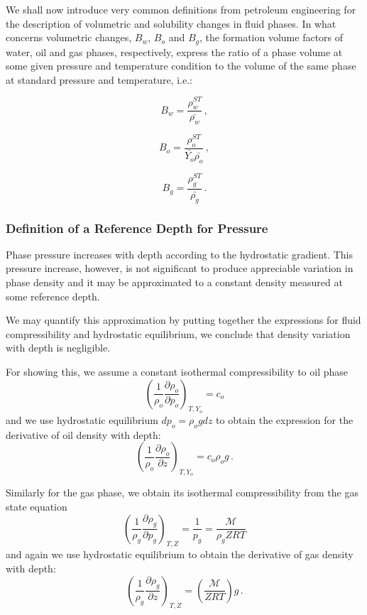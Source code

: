 \documentclass[authoryear,preprint,review,12pt]{elsarticle}
\begin{document}
We shall now introduce very common definitions from petroleum engineering for the description of volumetric and solubility changes in fluid phases. In what concerns volumetric changes, $B_w$, $B_o$ and $B_g$, the formation volume factors of water, oil and gas phases, respectively, express the ratio of a phase volume at some given pressure and temperature condition to the volume of the same phase at standard pressure and temperature, i.e.:

\begin{equation}\label{eq: Bw}
B_w = \frac{\rho_w^{ST}}{\bar{\rho_w}} \, ,
\end{equation}

\begin{equation}\label{eq: Bo}
B_o = \frac{\rho_o^{ST}}{\bar{Y_o} \bar{\rho_o}} \, ,
\end{equation}

\begin{equation}\label{eq: Bg}
B_g = \frac{\rho_g^{ST}}{\bar{\rho_g}} \, .
\end{equation}

\subsubsection{Definition of a Reference Depth for Pressure}

Phase pressure increases with depth according to the hydrostatic gradient. This pressure increase, however, is not significant to produce appreciable variation in phase density and it may be approximated to a constant density measured at some reference depth.

We may quantify this approximation by putting together the expressions for fluid compressibility and hydrostatic equilibrium, we conclude that density variation with depth is negligible.

For showing this, we assume a constant isothermal compressibility to oil phase
\begin{equation}\label{eq: grado}
\left( \frac{1}{\rho_o}\frac{\partial \rho_o}{\partial p_o} \right)_{T,Y_o} = c_o 
\end{equation}
and we use hydrostatic equilibrium $dp_o = \rho_o g dz$ to obtain the expression for the derivative of oil density with depth:
\begin{equation}
\left( \frac{1}{\rho_o}\frac{\partial \rho_o}{\partial z} \right)_{T,Y_o} = c_o \rho_o g \, .
\end{equation}

Similarly for the gas phase, we obtain its isothermal compressibility from the gas state equation
\begin{equation}
\left(\frac{1}{\rho_g}\frac{\partial \rho_g}{\partial p_g}\right)_{T,Z} = \frac{1}{p_g} = \frac{\mathcal{M}}{\rho_g ZRT}
\end{equation}
and again we use hydrostatic equilibrium to obtain the derivative of gas density with depth:
\begin{equation}\label{eq: gradg}
\left(\frac{1}{\rho_g}\frac{\partial \rho_g}{\partial z}\right)_{T,Z} = \left(\frac{\mathcal{M}}{ Z R T}\right) g \, .
\end{equation}
\end{document}
